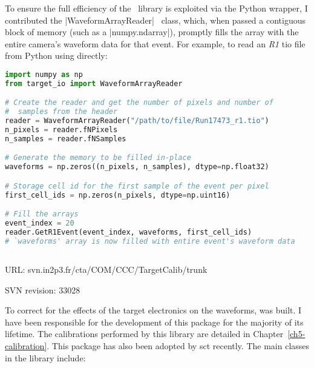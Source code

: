 To ensure the full efficiency of the \cpp~library is exploited via the Python wrapper, I contributed the |WaveformArrayReader| \cpp~class, which, when passed a contiguous block of memory (such as a \lstset{language=Python}|numpy.ndarray|), promptly fills the array with the entire camera's waveform data for that event. For example, to read an \textit{R1} \gls{tio} file from Python using  directly:

\begin{lstlisting}[language=Python]
import numpy as np
from target_io import WaveformArrayReader

# Create the reader and get the number of pixels and number of 
#  samples from the header
reader = WaveformArrayReader("/path/to/file/Run17473_r1.tio")
n_pixels = reader.fNPixels
n_samples = reader.fNSamples

# Generate the memory to be filled in-place
waveforms = np.zeros((n_pixels, n_samples), dtype=np.float32)

# Storage cell id for the first sample of the event per pixel
first_cell_ids = np.zeros(n_pixels, dtype=np.uint16)  

# Fill the arrays
event_index = 20
reader.GetR1Event(event_index, waveforms, first_cell_ids)
# `waveforms' array is now filled with entire event's waveform data
\end{lstlisting}

\subsection{}
\vspace{-0.7em}
\noindent \hspace{\parindent} {\tiny URL: svn.in2p3.fr/cta/COM/CCC/TargetCalib/trunk \par}
\noindent \hspace{\parindent} {\tiny SVN revision: 33028 \par}

\noindent To correct for the effects of the \gls{target} electronics on the waveforms,  was built. I have been responsible for the development of this package for the majority of its lifetime. The calibrations performed by this library are detailed in Chapter~\ref{ch5-calibration}. This package has also been adopted by \gls{sct} recently. The main classes in the library include:

